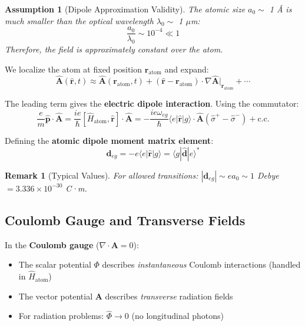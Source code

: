 \documentclass[12pt,a4paper]{article}
\newtheorem{remark}{Remark}
\newtheorem{assumption}{Assumption}
\begin{document}
\begin{assumption}[Dipole Approximation Validity]
The atomic size $a_0 \sim$ 1 Å is much smaller than the optical wavelength $\lambda_0 \sim$ 1 $\mu$m:
\begin{equation}
\frac{a_0}{\lambda_0} \sim 10^{-4} \ll 1
\end{equation}
Therefore, the field is approximately constant over the atom.
\end{assumption}

We localize the atom at fixed position $\mathbf{r}_{\text{atom}}$ and expand:
\begin{equation}
\hat{\mathbf{A}}(\hat{\mathbf{r}}, t) \approx \hat{\mathbf{A}}(\mathbf{r}_{\text{atom}}, t) + (\hat{\mathbf{r}} - \mathbf{r}_{\text{atom}}) \cdot \nabla\hat{\mathbf{A}}|_{\mathbf{r}_{\text{atom}}} + \cdots
\end{equation}

The leading term gives the \textbf{electric dipole interaction}. Using the commutator:
\begin{equation}
\frac{e}{m}\hat{\mathbf{p}} \cdot \hat{\mathbf{A}} = \frac{ie}{\hbar}[\hat{H}_{\text{atom}}, \hat{\mathbf{r}}] \cdot \hat{\mathbf{A}} = -\frac{ie\omega_{eg}}{\hbar}\langle e|\hat{\mathbf{r}}|g\rangle \cdot \hat{\mathbf{A}}(\hat{\sigma}^+ - \hat{\sigma}^-) + \text{c.c.}
\end{equation}

Defining the \textbf{atomic dipole moment matrix element}:
\begin{equation}
\mathbf{d}_{eg} = -e\langle e|\hat{\mathbf{r}}|g\rangle = \langle g|\hat{\mathbf{d}}|e\rangle^* \label{eq:dipole_moment}
\end{equation}

\begin{remark}[Typical Values]
For allowed transitions: $|\mathbf{d}_{eg}| \sim ea_0 \sim 1$ Debye $= 3.336 \times 10^{-30}$ C·m.
\end{remark}

\subsection{Coulomb Gauge and Transverse Fields}

In the \textbf{Coulomb gauge} ($\nabla \cdot \mathbf{A} = 0$):
\begin{itemize}[leftmargin=*]
\item The scalar potential $\Phi$ describes \textit{instantaneous} Coulomb interactions (handled in $\hat{H}_{\text{atom}}$)
\item The vector potential $\mathbf{A}$ describes \textit{transverse} radiation fields
\item For radiation problems: $\hat{\Phi} \rightarrow 0$ (no longitudinal photons)
\end{itemize}
\end{document}
